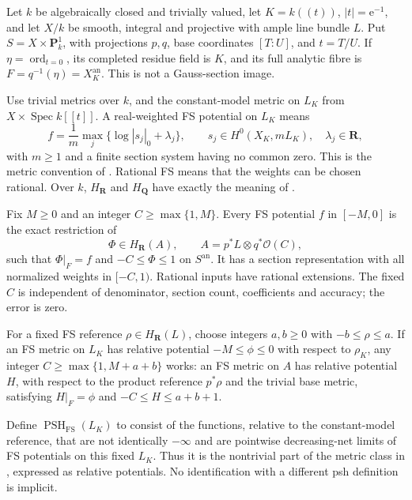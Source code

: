 Let \(k\) be algebraically closed and trivially valued, let
\(K=k((t))\), \(|t|=\mathrm e^{-1}\), and let \(X/k\) be smooth,
integral and projective with ample line bundle \(L\). Put
\(S=X\times\mathbf P^1_k\), with projections \(p,q\), base coordinates
\([T:U]\), and \(t=T/U\). If \(\eta=\operatorname{ord}_{t=0}\), its
completed residue field is \(K\), and its full analytic fibre is
\(F=q^{-1}(\eta)=X_K^{\mathrm{an}}\). This is not a Gauss-section image.

Use trivial metrics over \(k\), and the constant-model metric on \(L_K\)
from \(X\times\operatorname{Spec}k[[t]]\). A real-weighted FS potential
on \(L_K\) means
\begin{equation}\label{eq:p081-uniform-fs-definition}
 f=\frac1m\max_j\{\log|s_j|_0+\lambda_j\},\qquad
 s_j\in H^0(X_K,mL_K),\quad\lambda_j\in\mathbf R,
\end{equation}
with \(m\geq1\) and a finite section system having no common zero.
This is the metric convention of \cite[Definition~5.2]{BE2021}.
Rational FS means that the weights can be chosen rational. Over \(k\),
\(H_{\mathbf R}\) and \(H_{\mathbf Q}\) have exactly the meaning of
\cite[Definition~2.18]{BJ22}.

\begin{proposition}\label{prop:p081-uniform-fibre-fs-extension}
Fix \(M\geq0\) and an integer \(C\geq\max\{1,M\}\). Every FS
potential \(f\) in \([-M,0]\) is the exact restriction of
\[
 \Phi\in H_{\mathbf R}(A),\qquad
 A=p^*L\otimes q^*\mathcal O(C),
\]
such that \(\Phi|_F=f\) and \(-C\leq\Phi\leq1\) on
\(S^{\mathrm{an}}\). It has a section representation with all
normalized weights in \([-C,1)\). Rational inputs have rational
extensions. The fixed \(C\) is independent of denominator, section
count, coefficients and accuracy; the error is zero.

For a fixed FS reference \(\rho\in H_{\mathbf R}(L)\), choose
integers \(a,b\geq0\) with \(-b\leq\rho\leq a\). If an FS metric
on \(L_K\) has relative potential \(-M\leq\phi\leq0\) with respect
to \(\rho_K\), any integer \(C\geq\max\{1,M+a+b\}\) works: an FS
metric on \(A\) has relative potential \(H\), with respect to the
product reference \(p^*\rho\) and the trivial base metric, satisfying
\(H|_F=\phi\) and \(-C\leq H\leq a+b+1\).
\end{proposition}

Define \(\operatorname{PSH}_{\mathrm{FS}}(L_K)\) to consist of the
functions, relative to the constant-model reference, that are not
identically \(-\infty\) and are pointwise decreasing-net limits of FS
potentials on this fixed \(L_K\). Thus it is the nontrivial part of the
metric class in \cite[Definition~7.2]{BE2021}, expressed as relative
potentials. No identification with a different psh definition is implicit.

